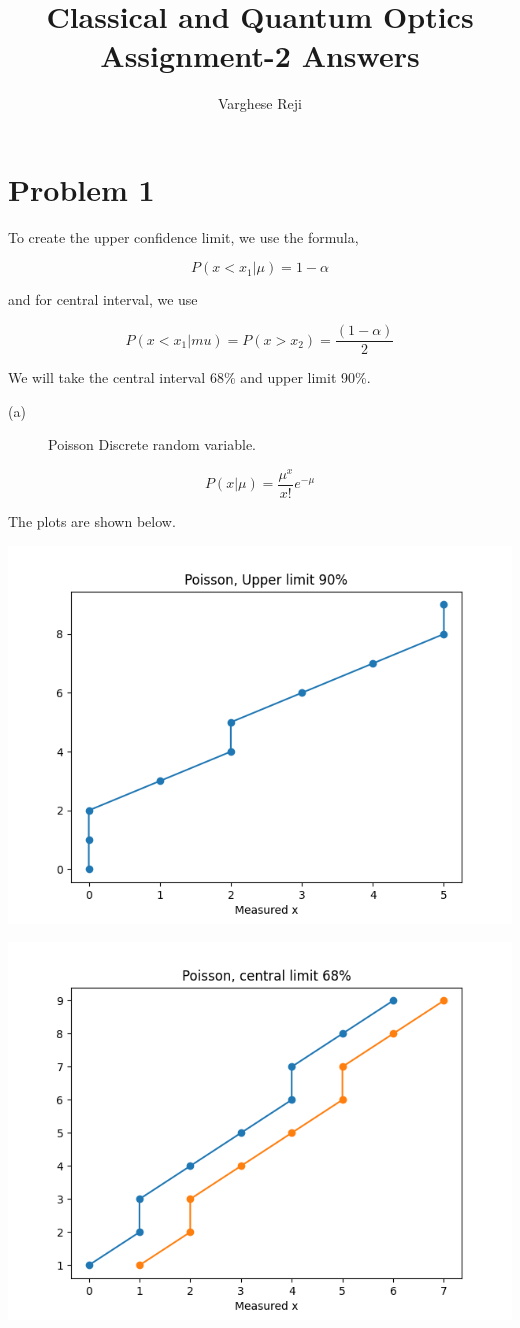 \documentclass[a4paper,11pt]{article}
\author{Varghese Reji}
\date{}
\title{Classical and Quantum Optics\\\medskip
\large Assignment-2 Answers}
\begin{document}
\maketitle

\section*{Problem 1}
\label{sec:orge48a648}

To create the upper confidence limit, we use the formula,

\begin{equation}
\label{eq:orgc65693c}
P(x<x_1|\mu)=1-\alpha
\end{equation}

and for central interval, we use

\begin{equation}
\label{eq:orgc54d74e}
P(x<x_1|mu)=P(x>x_2)=\frac{(1-\alpha)}{2}
\end{equation}

We will take the central interval 68\% and upper limit 90\%.

\begin{description}
\item[{(a)}] Poisson Discrete random variable.
\end{description}
  \begin{equation}
\label{eq:org7f868f1}
P(x|\mu) = \frac{\mu^x}{x!}e^{-\mu}
  \end{equation}

The plots are shown below.

\begin{center}
\includegraphics[width=.9\linewidth]{poisson_upper.png}
\end{center}

\begin{center}
\includegraphics[width=.9\linewidth]{poisson_central.png}
\end{center}
\end{document}
